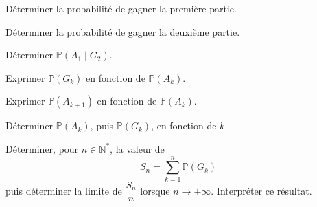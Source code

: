 \documentclass[10pt,a4paper]{article}
\begin{document}
\bigskip

\q Déterminer la probabilité de gagner la première partie.

\q Déterminer la probabilité de gagner la deuxième partie.

\q Déterminer \( \mathbb{P}(A_1 \mid G_2) \).

\q Exprimer \( \mathbb{P}(G_k) \) en fonction de \( \mathbb{P}(A_k) \).

\q Exprimer \( \mathbb{P}(A_{k+1}) \) en fonction de \( \mathbb{P}(A_k) \).

\q Déterminer \( \mathbb{P}(A_k) \), puis \( \mathbb{P}(G_k) \), en fonction de \( k \).

\q Déterminer, pour \( n \in \mathbb{N}^* \), la valeur de
\[
S_n = \sum_{k = 1}^{n} \mathbb{P}(G_k)
\]
puis déterminer la limite de \( \dfrac{S_n}{n} \) lorsque \( n \to +\infty \). Interpréter ce
résultat.
\end{document}
